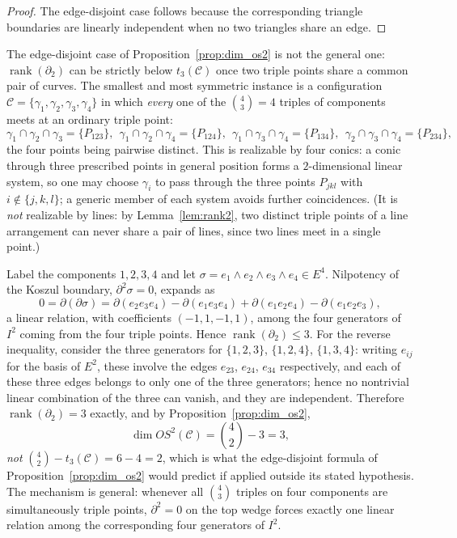 \documentclass[article,11pt]{amsart} \numberwithin{equation}{section}
\numberwithin{equation}{section}
\begin{document}
{\begin{proof}
	The edge-disjoint case follows because the corresponding triangle boundaries are linearly independent when no two triangles share an edge.
\end{proof}

\begin{ex}
	\label{ex:tetrahedral}
	The edge-disjoint case of Proposition~\ref{prop:dim_os2} is not the general one:
	$\operatorname{rank}(\partial_2)$ can be strictly below $t_3(\mathcal C)$ once two triple
	points share a common pair of curves. The smallest and most symmetric
	instance is a configuration $\mathcal C=\{\gamma_1,\gamma_2,\gamma_3,\gamma_4\}$ in which
	\emph{every} one of the $\binom43=4$ triples of components meets at an
	ordinary triple point:
	\[
	\gamma_1\cap \gamma_2\cap \gamma_3=\{P_{123}\},\ \ \gamma_1\cap \gamma_2\cap \gamma_4=\{P_{124}\},\ \
	\gamma_1\cap \gamma_3\cap \gamma_4=\{P_{134}\},\ \ \gamma_2\cap \gamma_3\cap \gamma_4=\{P_{234}\},
	\]
	the four points being pairwise distinct. This is realizable by four conics:
	a conic through three prescribed points in general position forms a
	$2$-dimensional linear system, so one may choose $\gamma_i$ to pass through the
	three points $P_{jkl}$ with $i\notin\{j,k,l\}$; a generic member of each
	system avoids further coincidences. (It is \emph{not} realizable by lines:
	by Lemma~\ref{lem:rank2}, two distinct triple points of a line arrangement can never
	share a pair of lines, since two lines meet in a single point.)
	
	Label the components $1,2,3,4$ and let $\sigma=e_1\wedge e_2\wedge
	e_3\wedge e_4\in E^4$. Nilpotency of the Koszul boundary, $\partial^2\sigma=0$,
	expands as
	\[
	0=\partial(\partial\sigma)=\partial(e_2e_3e_4)-\partial(e_1e_3e_4)
	+\partial(e_1e_2e_4)-\partial(e_1e_2e_3),
	\]
	a linear relation, with coefficients $(-1,1,-1,1)$, among the four
	generators of $I^2$ coming from the four triple points. Hence
	$\operatorname{rank}(\partial_2)\le3$. For the reverse inequality, consider the three
	generators for $\{1,2,3\}$, $\{1,2,4\}$, $\{1,3,4\}$: writing $e_{ij}$ for
	the basis of $E^2$, these involve the edges $e_{23}$, $e_{24}$, $e_{34}$
	respectively, and each of these three edges belongs to only one of the three
	generators; hence no nontrivial linear combination of the three can vanish,
	and they are independent. Therefore $\operatorname{rank}(\partial_2)=3$ exactly, and by
	Proposition~\ref{prop:dim_os2},
	\[
	\dim OS^2(\mathcal C)=\binom42-3=3,
	\]
	\emph{not} $\binom42-t_3(\mathcal C)=6-4=2$, which is what the edge-disjoint
	formula of Proposition~\ref{prop:dim_os2} would predict if applied outside its stated
	hypothesis. The mechanism is general: whenever all $\binom43$ triples on four
	components are simultaneously triple points, $\partial^2=0$ on the top wedge
	forces exactly one linear relation among the corresponding four generators of
	$I^2$.
\end{ex}




}
\end{document}
